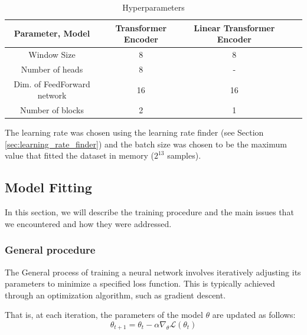 \documentclass[a4paper, twoside]{report}
\theoremstyle{definition}
\numberwithin{equation}{section}
\begin{document}
\begin{table}[h!]
    \centering
    \begin{tabular}{|c|c|c|c|c|}
        \hline
        Parameter, Model            & Transformer Encoder & Linear Transformer Encoder \\
        \hline
        Window Size                 & 8                   & 8                          \\
        Number of heads             & 8                   & -                          \\
        Dim. of FeedForward network & 16                  & 16                         \\
        Number of blocks            & 2                   & 1                          \\
        \hline
    \end{tabular}
    \caption{Hyperparameters}
    \label{tab:hyperparameters}
\end{table}

The learning rate was chosen using the learning rate finder \cite{1506.01186} (see Section \ref{sec:learning_rate_finder})
and the batch size was chosen to be the maximum value that
fitted the dataset in memory ($2^{13}$ samples).


\subsection{Model Fitting} \label{sec:training}

In this section, we will describe the training procedure and the main issues that we encountered and how they were addressed.

\subsubsection{General procedure}

The General process of training a neural network involves iteratively adjusting its
parameters to minimize a specified loss function.
This is typically achieved through an optimization algorithm, such as gradient descent.

That is, at each iteration, the parameters of the model $\theta$ are updated as follows:
\begin{equation} \label{eq:gradient_descent}
    \theta_{t+1}=\theta_t - \alpha \nabla_{\theta} \mathcal{L}(\theta_t)
\end{equation}
\end{document}
